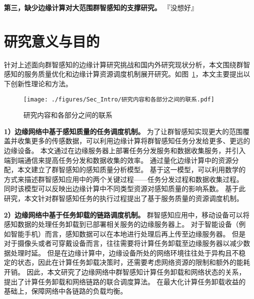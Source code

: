 \textbf{第三，缺少边缘计算对大范围群智感知的支撑研究。}
『没想好』



\section{研究意义与目的}

针对上述面向群智感知的边缘计算研究挑战和国内外研究现状分析，本文围绕群智感知的服务质量优化和边缘计算资源调度机制展开研究。如图~\ref{Figure_Re_Part}，本文主要提出以下创新性理论和方法。

\begin{figure}[!h]
  \centering
  \texttt{[image: ./figures/Sec\_Intro/研究内容和各部分之间的联系.pdf]}
  \vspace{-0.5em}
  \caption{研究内容和各部分之间的联系}
  \label{Figure_Re_Part}
\end{figure}

\textbf{1）边缘网络中基于感知质量的任务调度机制。}
为了让群智感知实现更大的范围覆盖并收集更多的传感数据，可以利用边缘计算将群智感知任务分发给更多、更远的边缘设备。
本文通过在边缘服务器上部署任务分发服务和数据收集服务，并引入端到端通信来提高任务分发和数据收集的效率。
通过量化边缘计算中的资源分配，本文建立了群智感知的感知质量分析模型。
基于这一模型，可以利用数学的方式来描述群智感知应用中的两个关键过程——任务分发过程和数据收集过程。
同时该模型可以反映出边缘计算中不同类型资源对感知质量的影响系数。
基于此研究，本文针对群智感知任务的执行过程提出了基于服务质量的资源调度机制。

\textbf{2）边缘网络中基于任务卸载的链路调度机制。}
群智感知应用中，移动设备可以将感知数据的处理任务卸载到已部署相关服务的边缘服务器上。
对于智能设备（例如智能手机）而言，感知数据可以在本地进行处理后再上传至边缘服务器。
但是对于摄像头或者可穿戴设备而言，往往需要将计算任务卸载至边缘服务器以减少数据处理时延。
但是在边缘计算中，边缘设备所处的网络环境往往处于异构且不稳定的状态，因此在计算任务卸载决策时，还需要考虑网络资源的限制和额外的能耗开销。
因此，本文研究了边缘网络中群智感知计算任务卸载和网络状态的关系，提出了计算任务卸载和网络链路的联合调度算法。
在最大化计算任务卸载收益的基础上，保障网络中各链路的负载均衡。


